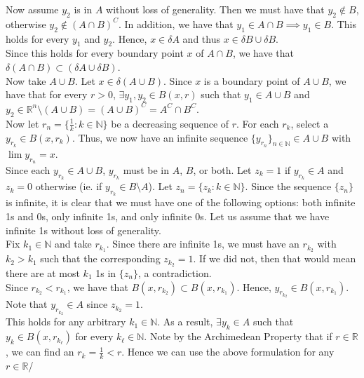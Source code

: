 \documentclass[12pt]{article}
\begin{document}
Now assume $y_2$ is in $A$ without loss of generality. Then we must have that $y_2 \not\in B$, otherwise $y_2 \not\in (A \cap B)^C$. In addition, we have that $y_1 \in A \cap B \implies y_1 \in B$. This holds for every $y_1$ and $y_2$. Hence, $x \in \delta A$ and thus $x \in \delta B \cup \delta B$.\\

Since this holds for every boundary point $x$ of $A \cap B$, we have that $\delta(A \cap B) \subset (\delta A \cup \delta B)$.\\

Now take $A \cup B$. Let $x \in \delta(A \cup B)$. Since $x$ is a boundary point of $A \cup B$, we have that for every $r > 0$, $\exists y_1, y_2 \in B(x, r)$ such that $y_1 \in A \cup B$ and $y_2 \in \mathbb{R}^n \setminus (A \cup B) = (A \cup B)^C = A^C \cap B^C$.\\

Now let $r_n = \{\frac{1}{k}: k \in \mathbb{N}\}$ be a decreasing sequence of $r$. For each $r_k$, select a $y_{r_k} \in B(x, r_k)$. Thus, we now have an infinite sequence $\{y_{r_n}\}_{n \in \mathbb{N}} \in A \cup B$ with $\lim y_{r_n} = x$.\\

Since each $y_{r_k} \in A \cup B$, $y_{r_k}$ must be in $A$, $B$, or both. Let $z_k = 1$ if $y_{r_k} \in A$ and $z_k = 0$ otherwise (ie. if $y_{r_k} \in B \setminus A$). Let $z_n = \{z_k: k \in \mathbb{N}\}$. Since the sequence $\{z_n\}$ is infinite, it is clear that we must have one of the following options: both infinite 1s and 0s, only infinite 1s, and only infinite 0s. Let us assume that we have infinite 1s without loss of generality.\\

Fix $k_1 \in \mathbb{N}$ and take $r_{k_1}$. Since there are infinite 1s, we must have an $r_{k_2}$ with $k_2 > k_1$ such that the corresponding $z_{k_2} = 1$. If we did not, then that would mean there are at most $k_1$ 1s in $\{z_n\}$, a contradiction.\\

Since $r_{k_2} < r_{k_1}$, we have that $B(x, r_{k_2}) \subset B(x, r_{k_1})$. Hence, $y_{r_{k_2}} \in B(x, r_{k_1})$. Note that $y_{r_{k_2}} \in A$ since $z_{k_2} = 1$.\\

This holds for any arbitrary $k_1 \in \mathbb{N}$. As a result, $\exists y_k \in A$ such that $y_k \in B(x, r_{k_{\ell}})$ for every $k_{\ell} \in \mathbb{N}$. Note by the Archimedean Property that if $r \in \mathbb{R}$, we can find an $r_k = \frac{1}{k} < r$. Hence we can use the above formulation for any $r \in \mathbb{R}$/\\
\end{document}
